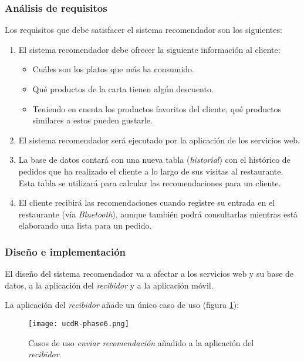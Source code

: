 \subsubsection{Análisis de requisitos}
Los requisitos que debe satisfacer el sistema recomendador son los siguientes:
\begin{enumerate}
\item El sistema recomendador debe ofrecer la siguiente información al cliente:
  \begin{itemize}
  \item Cuáles son los platos que más ha consumido.
  \item Qué productos de la carta tienen algún descuento.
  \item Teniendo en cuenta los productos favoritos del cliente, qué productos
  similares a estos pueden gustarle.
  \end{itemize}
\item El sistema recomendador será ejecutado por la aplicación de los
servicios web.
\item La base de datos contará con una nueva tabla (\emph{historial}) con el
histórico de pedidos que ha realizado el cliente a lo largo de sus visitas
al restaurante. Esta tabla se utilizará para calcular las recomendaciones para
un cliente.
\item El cliente recibirá las recomendaciones cuando registre su entrada en el
restaurante (vía \emph{Bluetooth}), aunque también podrá consultarlas mientras
está elaborando una lista para un pedido.
\end{enumerate}

\subsubsection{Diseño e implementación}
El diseño del sistema recomendador va a afectar a los servicios web y su
base de datos, a la aplicación del \emph{recibidor} y a la aplicación
móvil.

La aplicación del \emph{recibidor} añade un único caso de uso (figura
\ref{fig:ucdR-phase6}):

  \begin{figure}[!h]
    \begin{center}
      \texttt{[image: ucdR-phase6.png]}
      \caption{Casos de uso \emph{enviar recomendación} añadido a la aplicación 
      del \emph{recibidor}.}
      \label{fig:ucdR-phase6}
    \end{center}
  \end{figure}

